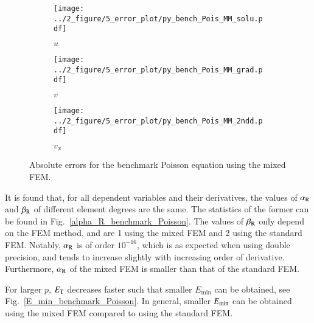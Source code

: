 \documentclass[review,3p]{elsarticle}
\begin{document}
\begin{figure}[!ht]
    \begin{subfigure}{5.5cm}
        \texttt{[image: ../2\_figure/5\_error\_plot/py\_bench\_Pois\_MM\_solu.pdf]}
        \caption{$u$}
        \label{py_bench_Pois_MM_solu}
    \end{subfigure}
    \hspace{-0.2cm}
    \begin{subfigure}{5.5cm}
        \texttt{[image: ../2\_figure/5\_error\_plot/py\_bench\_Pois\_MM\_grad.pdf]}
        \caption{$v$}
        \label{py_bench_Pois_MM_grad}
    \end{subfigure}
    \hspace{-0.2cm}
    \begin{subfigure}{5.5cm}
        \texttt{[image: ../2\_figure/5\_error\_plot/py\_bench\_Pois\_MM\_2ndd.pdf]}
        \caption{$v_x$}
        \label{py_bench_Pois_MM_2ndd}
    \end{subfigure}
\caption{Absolute errors for the benchmark Poisson equation using the mixed FEM.}
\label{py_bench_Pois_MM}
\end{figure}

It is found that, for all dependent variables and their derivatives, the values of $\alpha_{\rm R}$ and $\beta_{\rm R}$ of different element degrees are the same. The statistics of the former can be found in Fig.~\ref{alpha_R_benchmark_Poisson}. The values of $\beta_{\rm R}$ only depend on the FEM method, and are 1 using the mixed FEM and 2 using the standard FEM. Notably, $\alpha_{\rm R}$ is of order $10^{-16}$, which is as expected when using double precision, and tends to increase slightly with increasing order of derivative. Furthermore, $\alpha_{\rm R}$ of the mixed FEM is smaller than that of the standard FEM.  

For larger $p$, $E_{\rm T}$ decreases faster such that smaller ${E}_{\text{min}}$ can be obtained, see Fig.~\ref{E_min_benchmark_Poisson}. In general, smaller $E_{\rm min}$ can be obtained using the mixed FEM compared to using the standard FEM.
\end{document}
